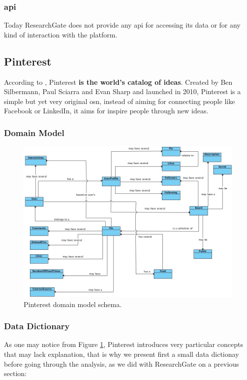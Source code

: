 \subsubsection*{\gls{api}}
Today ResearchGate does not provide any \gls{api} for accessing its data or for any kind of interaction with the platform.

\subsection{Pinterest}
According to \citep{pintabout}, Pinterest \textbf{is the world's catalog of ideas}. Created by Ben Silbermann, Paul Sciarra and Evan Sharp and launched in 2010, Pinterest is a simple but yet very original \gls{osn}, instead of aiming for connecting people like Facebook or LinkedIn, it aims for inspire people through new ideas.

\clearpage

\subsubsection*{Domain Model}

\begin{figure}[h!]
  \hspace*{-1in}
  \includegraphics[width=1.20\textwidth]{img/pinterest-domain-model.jpg}
\caption{\label{img:pintdomain} Pinterest domain model schema.}
\end{figure}

\subsubsection*{Data Dictionary}
As one may notice from Figure \ref{img:pintdomain}, Pinterest introduces very particular concepts that may lack explanation, that is why we present first a small data dictionay before going through the analysis, as we did with ResearchGate on a previous section:


